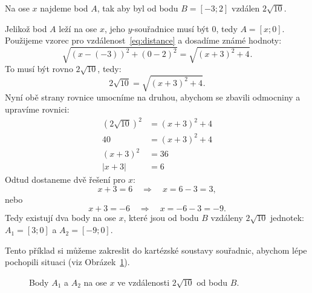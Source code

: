 \begin{example}
    Na ose $x$ najdeme bod $A$, tak aby byl od bodu $B = [-3;2]$ vzdálen $2\sqrt{10}$.

    Jelikož bod $A$ leží na ose $x$, jeho $y$-souřadnice musí být $0$, tedy $A = [x; 0]$. 
    Použijeme vzorec pro vzdálenost~\eqref{eq:distance} a dosadíme známé hodnoty:
    \[
    \sqrt{(x - (-3))^2 + (0 - 2)^2} = \sqrt{(x + 3)^2 + 4}.
    \]
    To musí být rovno $2\sqrt{10}$, tedy:
    \[
    2\sqrt{10} = \sqrt{(x + 3)^2 + 4}.
    \]
    Nyní obě strany rovnice umocníme na druhou, abychom se zbavili odmocniny a upravíme rovnici:
    \begin{align*}
        (2\sqrt{10})^2 &= (x + 3)^2 + 4 \\
        40 &= (x + 3)^2 + 4 \\
        (x + 3)^2 &= 36 \\
        |x + 3| &= 6
    \end{align*}
    Odtud dostaneme dvě řešení pro $x$:
    \[
    x + 3 = 6 \quad \Rightarrow \quad x = 6 - 3 = 3,
    \]
    nebo
    \[
    x + 3 = -6 \quad \Rightarrow \quad x = -6 - 3 = -9.
    \]
    Tedy existují dva body na ose $x$, které jsou od bodu $B$ vzdáleny $2\sqrt{10}$ jednotek: $A_1 = [3; 0]$ a $A_2 = [-9; 0]$.

    Tento příklad si můžeme zakreslit do kartézské soustavy souřadnic, abychom lépe pochopili situaci (viz Obrázek~\ref{fig:distance_example}).

    \begin{figure}[H]
        \centering
        \caption{Body $A_1$ a $A_2$ na ose $x$ ve vzdálenosti $2\sqrt{10}$ od bodu $B$.}
        \label{fig:distance_example}
    \end{figure}
\end{example}




